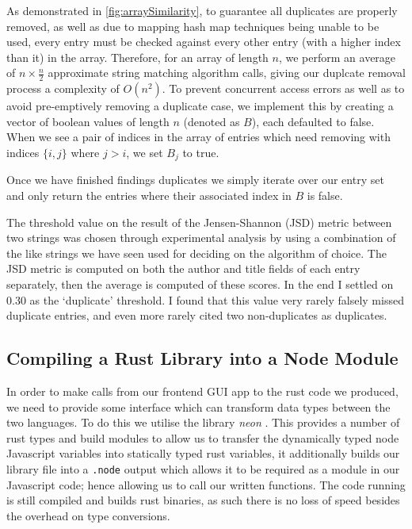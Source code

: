 \documentclass[a4paper,11pt]{article}
\newcommand{\code}[1]{\colorbox{codegray}{\texttt{#1}}}
\begin{document}
As demonstrated in \ref{fig:arraySimilarity}, to guarantee all duplicates are properly removed, as well as due to mapping hash map techniques being unable to be used, every entry must be checked against every other entry (with a higher index than it) in the array. Therefore, for an array of length $n$, we perform an average of $n \times \frac{n}{2}$ approximate string matching algorithm calls, giving our duplcate removal process a complexity of $O(n^2)$. To prevent concurrent access errors as well as to avoid pre-emptively removing a duplicate case, we implement this by creating a vector of boolean values of length $n$ (denoted as $B$), each defaulted to false. When we see a pair of indices in the array of entries which need removing with indices $\{i,j\}$ where $j > i$, we set
$B_j$ to true.

Once we have finished findings duplicates we simply iterate over our entry set and only return the entries where their associated index in $B$ is false.

The threshold value on the result of the Jensen-Shannon (JSD) metric between two strings was chosen through experimental analysis by using a combination of the like strings we have seen used for deciding on the algorithm of choice. The JSD metric is computed on both the author and title fields of each entry separately, then the average is computed of these scores. In the end I settled on 0.30 as the `duplicate' threshold. I found that this value very rarely falsely missed duplicate entries, and even more rarely cited two non-duplicates as duplicates.

\subsection{Compiling a Rust Library into a Node Module}
In order to make calls from our frontend GUI app to the rust code we produced, we need to provide some interface which can transform data types between the two languages. To do this we utilise the library \textit{neon} \citep{neon}. This provides a number of rust types and build modules to allow us to transfer the dynamically typed node Javascript variables into statically typed rust variables, it additionally builds our library file into a \code{.node} output which allows it to be required as a module in our Javascript code; hence allowing us to call our written functions. The code running is still compiled and builds rust binaries, as such there is no loss of speed besides the overhead on type conversions.
\end{document}
